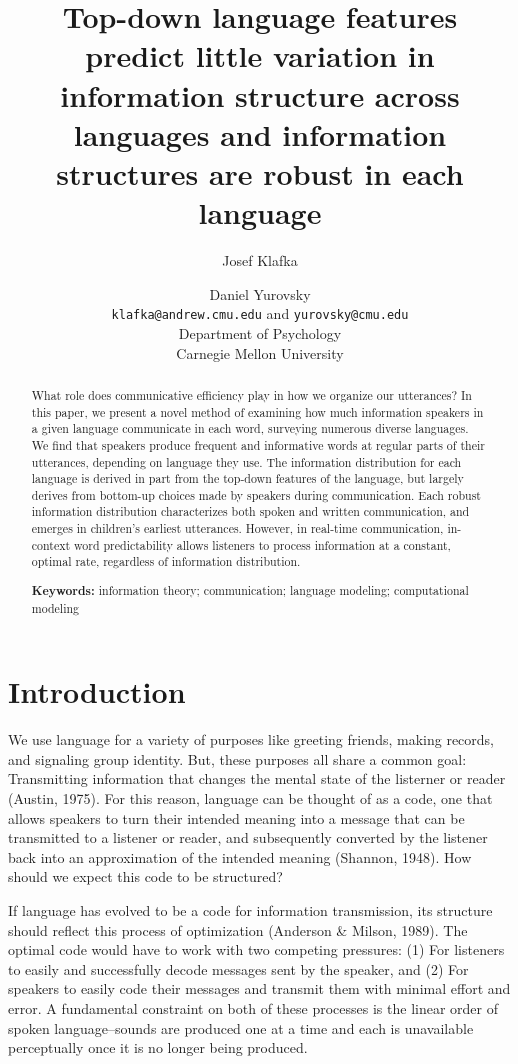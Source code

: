 \documentclass[10pt, letterpaper]{article}
\title{Top-down language features predict little variation in information
structure across languages and information structures are robust in each
language}
\author{Josef Klafka \and Daniel Yurovsky \\
        \texttt{klafka@andrew.cmu.edu} and \texttt{yurovsky@cmu.edu} \\
       Department of Psychology \\ Carnegie Mellon University}
\begin{document}
\maketitle

\begin{abstract}
What role does communicative efficiency play in how we organize our
utterances? In this paper, we present a novel method of examining how
much information speakers in a given language communicate in each word,
surveying numerous diverse languages. We find that speakers produce
frequent and informative words at regular parts of their utterances,
depending on language they use. The information distribution for each
language is derived in part from the top-down features of the language,
but largely derives from bottom-up choices made by speakers during
communication. Each robust information distribution characterizes both
spoken and written communication, and emerges in children's earliest
utterances. However, in real-time communication, in-context word
predictability allows listeners to process information at a constant,
optimal rate, regardless of information distribution.

\textbf{Keywords:}
information theory; communication; language modeling; computational
modeling
\end{abstract}

\hypertarget{introduction}{%
\section{Introduction}\label{introduction}}

We use language for a variety of purposes like greeting friends, making
records, and signaling group identity. But, these purposes all share a
common goal: Transmitting information that changes the mental state of
the listerner or reader (Austin, 1975). For this reason, language can be
thought of as a code, one that allows speakers to turn their intended
meaning into a message that can be transmitted to a listener or reader,
and subsequently converted by the listener back into an approximation of
the intended meaning (Shannon, 1948). How should we expect this code to
be structured?

If language has evolved to be a code for information transmission, its
structure should reflect this process of optimization (Anderson \&
Milson, 1989). The optimal code would have to work with two competing
pressures: (1) For listeners to easily and successfully decode messages
sent by the speaker, and (2) For speakers to easily code their messages
and transmit them with minimal effort and error. A fundamental
constraint on both of these processes is the linear order of spoken
language--sounds are produced one at a time and each is unavailable
perceptually once it is no longer being produced.
\end{document}
